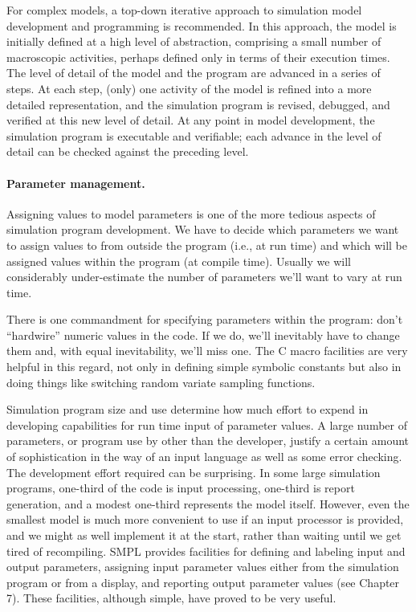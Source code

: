 For complex models, a top-down iterative approach to simulation model
development and programming is recommended. In this approach, the model is
initially defined at a high level of abstraction, comprising a small number of
macroscopic activities, perhaps defined only in terms of their execution
times. The level of detail of the model and the program are advanced in a
series of steps. At each step, (only) one activity of the model is refined into
a more detailed representation, and the simulation program is revised,
debugged, and verified at this new level of detail. At any point in model
development, the simulation program is executable and verifiable; each advance
in the level of detail can be checked against the preceding level.

\paragraph{Parameter management.}
Assigning values to model parameters is one of the more tedious aspects of
simulation program development. We have to decide which parameters we want to
assign values to from outside the program (i.e., at run time) and which will
be assigned values within the program (at compile time). Usually we will
considerably under-estimate the number of parameters we'll want to vary at run
 time.

There is one commandment for specifying parameters within the program: don't
``hardwire'' numeric values in the code. If we do, we'll inevitably have to
change them and, with equal inevitability, we'll miss one. The C macro
facilities are very helpful in this regard, not only in defining simple
symbolic constants but also in doing things like switching random variate
sampling functions.

Simulation program size and use determine how much effort to expend in
developing capabilities for run time input of parameter values. A large number
of parameters, or program use by other than the developer, justify a certain
amount of sophistication in the way of an input language as well as some error
checking. The development effort required can be surprising. In some large
simulation programs, one-third of the code is input processing, one-third is
report generation, and a modest one-third represents the model itself.
However, even the smallest model is much more convenient to use if an input
processor is provided, and we might as well implement it at the start, rather
than waiting until we get tired of recompiling. SMPL provides facilities for
defining and labeling input and output parameters, assigning input parameter
values either from the simulation program or from a display, and reporting
output parameter values (see Chapter 7). These facilities, although simple,
have proved to be very useful.

